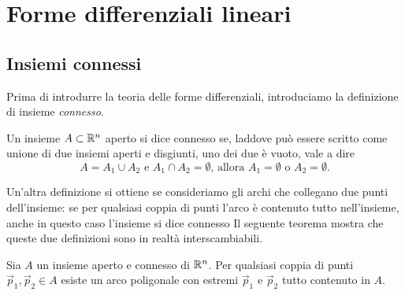 \chapter{Forme differenziali lineari}
\section{Insiemi connessi}
Prima di introdurre la teoria delle forme differenziali, introduciamo la definizione di insieme \emph{connesso}.
\begin{definizione} \label{d:connesso}
	Un insieme $A\subset\mathbb{R}^n$ aperto si dice connesso se, laddove può essere scritto come unione di due insiemi aperti e disgiunti, uno dei due è vuoto, vale a dire
	\begin{equation*}
		A=A_1\cup A_2\text{ e }A_1\cap A_2=\emptyset\text{, allora }A_1=\emptyset\text{ o }A_2=\emptyset.
	\end{equation*}
\end{definizione}
Un'altra definizione si ottiene se consideriamo gli archi che collegano due punti dell'insieme: se per qualsiasi coppia di punti l'arco è contenuto tutto nell'insieme, anche in questo caso l'insieme si dice connesso
Il seguente teorema mostra che queste due definizioni sono in realtà interscambiabili.
\begin{teorema} \label{t:connessione-per-archi}
	Sia $A$ un insieme aperto e connesso di $\mathbb{R}^n$.
	Per qualsiasi coppia di punti $\vec p_1,\vec p_2\in A$ esiste un arco poligonale con estremi $\vec p_1$ e $\vec p_2$ tutto contenuto in $A$.
\end{teorema}
